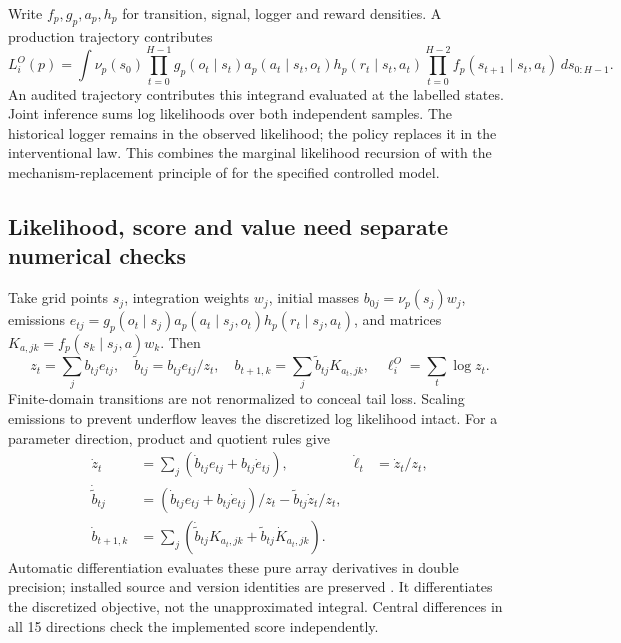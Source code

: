 Write $f_p,g_p,a_p,h_p$ for transition, signal, logger and reward densities.
A production trajectory contributes
\begin{equation}
 L_i^O(p)=\int\nu_p(s_0)
  \prod_{t=0}^{H-1}g_p(o_t\mid s_t)a_p(a_t\mid s_t,o_t)h_p(r_t\mid s_t,a_t)
  \prod_{t=0}^{H-2}f_p(s_{t+1}\mid s_t,a_t)\,ds_{0:H-1}.
 \label{c7:nonlinear-likelihood}
\end{equation}
An audited trajectory contributes this integrand evaluated at the labelled
states. Joint inference sums log likelihoods over both independent samples.
The historical logger remains in the observed likelihood; the policy replaces
it in the interventional law. This combines the marginal likelihood recursion
of \citet[Theorem 12.1]{sarkka2013} with the mechanism-replacement principle
of \citet[Corollary 1]{pearl2009} for the specified controlled model.

\subsection{Likelihood, score and value need separate numerical checks}
Take grid points $s_j$, integration weights $w_j$, initial masses
$b_{0j}=\nu_p(s_j)w_j$, emissions
$e_{tj}=g_p(o_t\mid s_j)a_p(a_t\mid s_j,o_t)h_p(r_t\mid s_j,a_t)$,
and matrices $K_{a,jk}=f_p(s_k\mid s_j,a)w_k$. Then
\[
 z_t=\sum_j b_{tj}e_{tj},\quad
 \widetilde b_{tj}=b_{tj}e_{tj}/z_t,\quad
 b_{t+1,k}=\sum_j\widetilde b_{tj}K_{a_t,jk},\quad
 \ell_i^O=\sum_t\log z_t.
\]
Finite-domain transitions are not renormalized to conceal tail loss. Scaling
emissions to prevent underflow leaves the discretized log likelihood intact.
For a parameter direction, product and quotient rules give
\begin{align*}
 \dot z_t&=\sum_j(\dot b_{tj}e_{tj}+b_{tj}\dot e_{tj}),
 &\dot\ell_t&=\dot z_t/z_t,\\
 \dot{\widetilde b}_{tj}&=(\dot b_{tj}e_{tj}+b_{tj}\dot e_{tj})/z_t
                         -\widetilde b_{tj}\dot z_t/z_t,\\
 \dot b_{t+1,k}&=\sum_j(\dot{\widetilde b}_{tj}K_{a_t,jk}
                            +\widetilde b_{tj}\dot K_{a_t,jk}).
\end{align*}
Automatic differentiation evaluates these pure array derivatives in double
precision; installed source and version identities are preserved
\citep{jaxruntime2026}. It differentiates the discretized objective, not the
unapproximated integral. Central differences in all 15 directions check the
implemented score independently.

